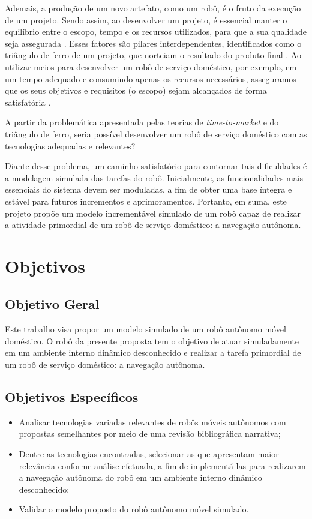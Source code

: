 Ademais, a produção de um novo artefato, como um robô, é o fruto da execução de um projeto. Sendo assim, ao desenvolver um projeto, é essencial manter o equilíbrio entre o escopo, tempo e os recursos utilizados, para que a sua qualidade seja assegurada \cite{pmbok}. Esses fatores são pilares interdependentes, identificados como o triângulo de ferro de um projeto, que norteiam o resultado do produto final \cite{pmbok}. Ao utilizar meios para desenvolver um robô de serviço doméstico, por exemplo, em um tempo adequado e consumindo apenas os recursos necessários, asseguramos que os seus objetivos e requisitos (o escopo) sejam alcançados de forma satisfatória \cite{pmbok}.

A partir da problemática apresentada pelas teorias de \textit{time-to-market} e do triângulo de ferro,
seria possível desenvolver um robô de serviço doméstico com as tecnologias adequadas e relevantes?

Diante desse problema, um caminho satisfatório para contornar tais dificuldades é a modelagem simulada das tarefas do robô. Inicialmente, as funcionalidades mais essenciais do sistema devem ser moduladas, a fim de obter uma base íntegra e estável para futuros incrementos e aprimoramentos. Portanto, em suma, este projeto propõe um modelo incrementável simulado de um robô capaz de realizar a atividade primordial de um robô de serviço doméstico: a navegação autônoma.

\section{Objetivos}
\label{sec-objetivos}

\subsection{Objetivo Geral}

Este trabalho visa propor um modelo simulado de um robô autônomo móvel doméstico. O robô da presente proposta tem o objetivo de atuar simuladamente em um ambiente interno dinâmico desconhecido e realizar a tarefa primordial de um robô de serviço doméstico: a navegação autônoma.

\subsection{Objetivos Específicos}
\begin{itemize}
  \item  Analisar tecnologias variadas relevantes de robôs móveis autônomos com propostas semelhantes por meio de uma revisão bibliográfica narrativa;
  \item Dentre as tecnologias encontradas, selecionar as que apresentam maior relevância conforme análise efetuada, a fim de implementá-las para realizarem a navegação autônoma do robô em um ambiente interno dinâmico desconhecido;
  \item Validar o modelo proposto do robô autônomo móvel simulado.
\end{itemize}


